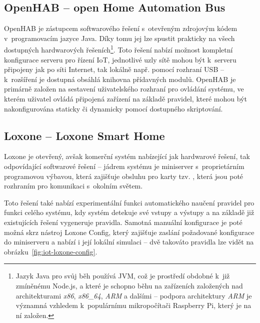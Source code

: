 \subsection{OpenHAB -- open Home Automation Bus}\label{subsec:openhab}
OpenHAB je zástupcem softwarového řešení s~otevřeným zdrojovým kódem v~programovacím jazyce Java.
Díky tomu jej lze spustit prakticky na všech dostupných hardwarových řešeních\footnote{Jazyk Java pro svůj běh
používá JVM, což je prostředí obdobné k~již zmíněnému Node.js, a které je schopno běhu na zařízeních založených nad
architekturami \textit{x86}, \textit{x86\_64}, \textit{ARM} a dalšími -- podpora architektury \textit{ARM} je
významná vzhledem k~populárnímu mikropočítači Raspberry Pi, který je na ní založen.}.
Toto řešení nabízí možnost kompletní konfigurace serveru pro řízení IoT, jednotlivé uzly sítě mohou být k~serveru
připojeny jak po síti Internet, tak lokálně např. pomocí rozhraní USB -- k~rozšíření je dostupná obsáhlá
knihovna přídavných modulů.
OpenHAB je primárně založen na sestavení uživatelského rozhraní pro ovládání systému, ve kterém uživatel ovládá
připojená zařízení na základě pravidel, které mohou být nakonfigurována staticky či dynamicky pomocí dostupného
skriptování.

\subsection{Loxone -- Loxone Smart Home}\label{subsec:loxone}
Loxone je otevřený, avšak komerční systém nabízející jak hardwarové řešení, tak odpovídající softwarové řešení --
jádrem systému je miniserver s~proprietárním programovou výbavou, která zajišťuje obsluhu pro karty tzv. , která jsou poté rozhraním pro komunikaci s~okolním světem.

Toto řešení také nabízí experimentální funkci automatického naučení pravidel pro funkci celého systému, kdy
systém detekuje své vstupy a výstupy a na základě již existujících řešení vygeneruje pravidla.
Samotná manuální konfigurace je poté možná skrz nástroj Loxone Config, který zajišťuje zaslání požadované
konfigurace do miniserveru a nabízí i její lokální simulaci -- dvě takováto pravidla lze vidět na
obrázku~\ref{fig:iot-loxone-config}.

